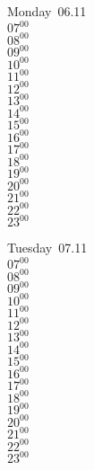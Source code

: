 \documentclass[11pt, a4paper]{book}\usepackage[]{graphicx}\usepackage[]{color}
\begin{document}
\begin{headerbox}
\end{headerbox}
\begin{weekdaybox}
  Monday~06.11\\
  { 
  \vfill
  $07^{00}$\\
$08^{00}$\\
$09^{00}$\\
$10^{00}$\\
$11^{00}$\\
$12^{00}$\\
$13^{00}$\\
$14^{00}$\\
$15^{00}$\\
$16^{00}$\\
$17^{00}$\\
$18^{00}$\\
$19^{00}$\\
$20^{00}$\\
$21^{00}$\\
$22^{00}$\\
$23^{00}$\\
  }
\end{weekdaybox}
\begin{weekdaybox}
  Tuesday~07.11\\
  { 
  \vfill
  $07^{00}$\\
$08^{00}$\\
$09^{00}$\\
$10^{00}$\\
$11^{00}$\\
$12^{00}$\\
$13^{00}$\\
$14^{00}$\\
$15^{00}$\\
$16^{00}$\\
$17^{00}$\\
$18^{00}$\\
$19^{00}$\\
$20^{00}$\\
$21^{00}$\\
$22^{00}$\\
$23^{00}$\\
  }
\end{weekdaybox}
\end{document}

